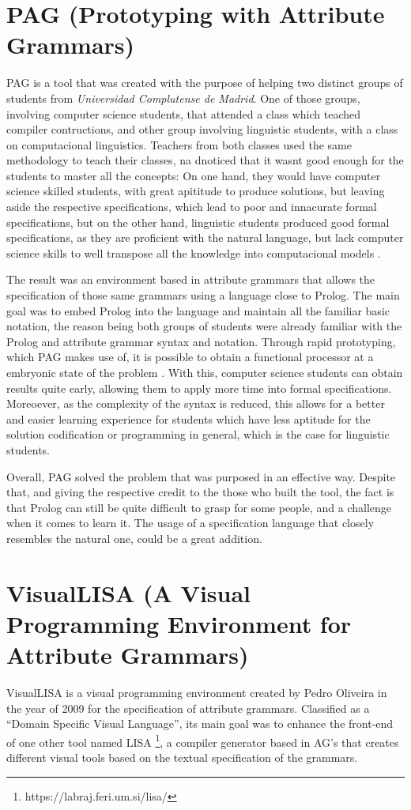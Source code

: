 \section{PAG (Prototyping with Attribute Grammars)}
PAG is a tool that was created with the purpose of helping two distinct groups of students from \emph{Universidad Complutense de Madrid}. One of those groups, involving computer science students, that attended a class which teached compiler contructions, and other group involving linguistic students, with a class on computacional linguistics. Teachers from both classes used the same methodology to teach their classes, na dnoticed that it wasnt good enough for the students to master all the concepts: On one hand, they would have computer science skilled students, with great apititude to produce solutions, but leaving aside the respective specifications, which lead to poor and innacurate formal specifications, but on the other hand, linguistic students produced good formal specifications, as they are proficient with the natural language, but lack computer science skills to well transpose all the knowledge into computacional models \cite{sierra_2006}.
	
The result was an environment based in attribute grammars that allows the specification of those same grammars using a language close to Prolog. The main goal was to embed Prolog into the language and maintain all the familiar basic notation, the reason being both groups of students were already familiar with the Prolog and attribute grammar syntax and notation. Through rapid prototyping, which PAG makes use of, it is possible to obtain a functional processor at a embryonic state of the problem \cite{sierra_2006}. With this, computer science students can obtain results quite early, allowing them to apply more time into formal specifications. Moreoever, as the complexity of the syntax is reduced, this allows for a better and easier learning experience for students which have less aptitude for the solution codification or programming in general, which is the case for linguistic students.
	
Overall, PAG solved the problem that was purposed in an effective way. Despite that, and giving the respective credit to the those who built the tool, the fact is that Prolog can still be quite difficult to grasp for some people, and a challenge when it comes to learn it. The usage of a specification language that closely resembles the natural one, could be a great addition.
	
\section{VisualLISA (A Visual Programming Environment for Attribute Grammars)}
VisualLISA is a visual programming environment created by Pedro Oliveira in the year of 2009 \cite{oliveira_2009} for the specification of attribute grammars. Classified as a ``Domain Specific  Visual Language'', its main goal was to enhance the front-end of one other tool named LISA \footnote{https://labraj.feri.um.si/lisa/}, a compiler generator based in AG's that creates different visual tools based on the textual specification of the grammars.
    

